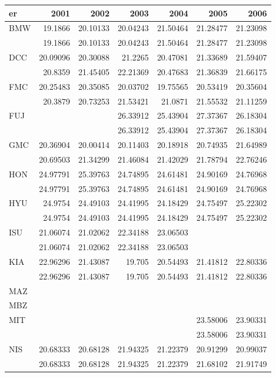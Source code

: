 \begin{tabular}{lrrrrrr}
\toprule
er & 2001 & 2002 & 2003 & 2004 & 2005 & 2006 \\
\midrule
BMW & 19.1866 & 20.10133 & 20.04243 & 21.50464 & 21.28477 & 21.23098 \\
 & 19.1866 & 20.10133 & 20.04243 & 21.50464 & 21.28477 & 21.23098 \\
DCC & 20.09096 & 20.30088 & 21.2265 & 20.47081 & 21.33689 & 21.59407 \\
 & 20.8359 & 21.45405 & 22.21369 & 20.47683 & 21.36839 & 21.66175 \\
FMC & 20.25483 & 20.35085 & 20.03702 & 19.75565 & 20.53419 & 20.35604 \\
 & 20.3879 & 20.73253 & 21.53421 & 21.0871 & 21.55532 & 21.11259 \\
FUJ &  &  & 26.33912 & 25.43904 & 27.37367 & 26.18304 \\
 &  &  & 26.33912 & 25.43904 & 27.37367 & 26.18304 \\
GMC & 20.36904 & 20.00414 & 20.11403 & 20.18918 & 20.74935 & 21.64989 \\
 & 20.69503 & 21.34299 & 21.46084 & 21.42029 & 21.78794 & 22.76246 \\
HON & 24.97791 & 25.39763 & 24.74895 & 24.61481 & 24.90169 & 24.76968 \\
 & 24.97791 & 25.39763 & 24.74895 & 24.61481 & 24.90169 & 24.76968 \\
HYU & 24.9754 & 24.49103 & 24.41995 & 24.18429 & 24.75497 & 25.22302 \\
 & 24.9754 & 24.49103 & 24.41995 & 24.18429 & 24.75497 & 25.22302 \\
ISU & 21.06074 & 21.02062 & 22.34188 & 23.06503 &  &  \\
 & 21.06074 & 21.02062 & 22.34188 & 23.06503 &  &  \\
KIA & 22.96296 & 21.43087 & 19.705 & 20.54493 & 21.41812 & 22.80336 \\
 & 22.96296 & 21.43087 & 19.705 & 20.54493 & 21.41812 & 22.80336 \\
MAZ &  &  &  &  &  &  \\
MBZ &  &  &  &  &  &  \\
MIT &  &  &  &  & 23.58006 & 23.90331 \\
 &  &  &  &  & 23.58006 & 23.90331 \\
NIS & 20.68333 & 20.68128 & 21.94325 & 21.22379 & 20.91299 & 20.99037 \\
 & 20.68333 & 20.68128 & 21.94325 & 21.22379 & 21.68102 & 21.91749 \\

\end{tabular}
